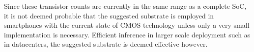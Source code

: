 
Since these transistor counts are currently in the same range as a complete \ac{SoC}, it is not deemed probable that the suggested substrate is employed in smartphones with the current state of \ac{CMOS} technology unless only a very small implementation is necessary. Efficient inference in larger scale deployment such as in datacenters, the suggested substrate is deemed effective however. 




